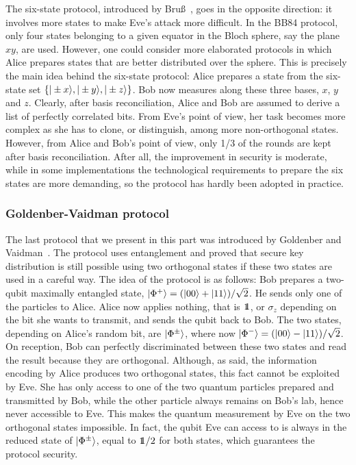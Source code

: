 \documentclass[a4paper]{article}
\def\one{\leavevmode\hbox{\small1\normalsize\kern-.33em1}}
\begin{document}
The six-state protocol, introduced by Bru{\ss}~\cite{6state}, 
goes in the opposite direction: it involves more states to make
Eve's attack more difficult. In the BB84 protocol, only four states
belonging to a given equator in the Bloch sphere, say the plane
$xy$, are used. However, one could consider more elaborated
protocols in which Alice prepares states that are better
distributed over the sphere. This is precisely the main idea
behind the six-state protocol: Alice prepares a state from the
six-state set $\{|\pm x\rangle,|\pm y\rangle,|\pm z\rangle\}$. Bob now
measures along these three bases, $x$, $y$ and $z$. Clearly, after basis reconciliation,
Alice and Bob are assumed to derive a list of perfectly correlated
bits. From Eve's point of view, her task becomes more complex as
she has to clone, or distinguish, among more non-orthogonal
states. However, from Alice and Bob's point of view, only 1/3 of the rounds are kept after basis reconciliation. 
After all, the improvement in security is moderate, while in some implementations the technological
requirements to prepare the six states are more demanding, so the protocol has hardly been adopted in practice.

\subsubsection{Goldenber-Vaidman protocol}

The last protocol that we present in this part was introduced by
Goldenber and Vaidman~\cite{vaidman}. The protocol uses entanglement and proved that secure key
distribution is still possible using two orthogonal states if
these two states are used in a careful way. The idea of the
protocol is as follows: Bob prepares a two-qubit maximally
entangled state, $|\Phi^+\rangle=(|00\rangle+|11\rangle)/\sqrt 2$. He
sends only one of the particles to Alice. Alice now applies nothing, that is $\one$,
or $\sigma_z$ depending on the bit she wants to transmit, and sends
the qubit back to Bob. The two states, depending on Alice's random
bit, are $|\Phi^\pm\rangle$, where now $|\Phi^-\rangle=(|00\rangle-|11\rangle)/\sqrt 2$. On reception, Bob
can perfectly discriminated between these two states and read the result because they are orthogonal.
Although, as said, the information encoding by Alice produces two
orthogonal states, this fact cannot be exploited by Eve. She has
only access to one of the two
quantum particles prepared and transmitted  by Bob, while the other particle always remains on
Bob's lab, hence never accessible to Eve. This makes the quantum measurement by Eve on the two
orthogonal states impossible. In fact, the qubit Eve can access to is always in the reduced state of $|\Phi^\pm\rangle$, equal to $\one/2$ for both states, which guarantees the protocol security.
\end{document}
